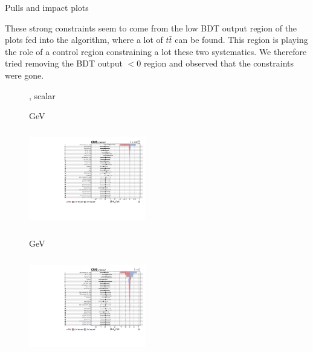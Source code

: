 \documentclass[8pt]{beamer}
\begin{document}
\begin{frame}{Pulls and impact plots}
\justifying

These strong constraints seem to come from the low BDT output region of the plots
fed into the algorithm, where a lot of $t \bar t$ can be found. This region is playing
the role of a control region constraining a lot these two systematics. \vfill
We therefore tried removing the BDT output $< 0$ region and observed that the constraints were gone. \vfill

\begin{figure}[htbp]
\centering
\begin{block}{, scalar}\end{block}	\vspace{-8pt}

\begin{minipage}[b]{0.49\textwidth}
\begin{center}
\centering \begin{block}{ GeV}\end{block}	
\includegraphics[width=5.1cm, height=4.2cm]{figs/impacts_fixed/impacts_2018_both_scalar_100.pdf}
\end{center}
\end{minipage}\hfill
\begin{minipage}[b]{0.49\textwidth}
\begin{center}
\centering \begin{block}{ GeV}\end{block}	
\includegraphics[width=5.1cm, height=4.2cm]{figs/impacts_fixed/impacts_2018_both_scalar_500.pdf}
\end{center}
\end{minipage} \hfill
\end{figure} \vfill
\end{frame}
\end{document}
